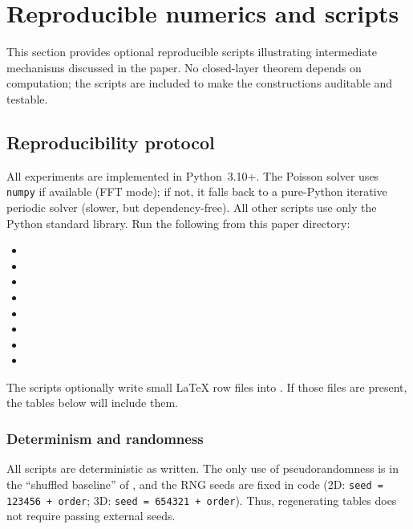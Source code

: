 
\section{Reproducible numerics and scripts}
\label{sec:experiments}

This section provides optional reproducible scripts illustrating intermediate mechanisms discussed in the paper.
No closed-layer theorem depends on computation; the scripts are included to make the constructions auditable and testable.

\subsection{Reproducibility protocol}
\label{sec:repro_protocol}

All experiments are implemented in Python~3.10+.
The Poisson solver uses \texttt{numpy} if available (FFT mode); if not, it falls back to a pure-Python iterative periodic solver (slower, but dependency-free).
All other scripts use only the Python standard library.
Run the following from this paper directory:
\begin{itemize}
\item {}
\item {}
\item {}
\item {}
\item {}
\item {}
\item {}
\item {}
\end{itemize}

The scripts optionally write small \LaTeX{} row files into .
If those files are present, the tables below will include them.

\subsubsection*{Determinism and randomness}
All scripts are deterministic as written.
The only use of pseudorandomness is in the ``shuffled baseline'' of , and the RNG seeds are fixed in code (2D: \texttt{seed = 123456 + order}; 3D: \texttt{seed = 654321 + order}).
Thus, regenerating tables does not require passing external seeds.

